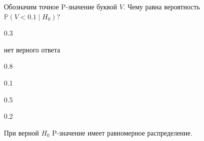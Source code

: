 
\begin{question}
Обозначим точное P-значение буквой \(V\).
Чему равна вероятность \(\mathbb{P} (V < 0.1 \mid H_0)\)?
\begin{answerlist}
  \item 0.3
  \item нет верного ответа
  \item 0.8
  \item 0.1
  \item 0.5
  \item 0.2
\end{answerlist}
\end{question}

\begin{solution}
При верной \(H_0\) P-значение имеет равномерное распределение.
\end{solution}

